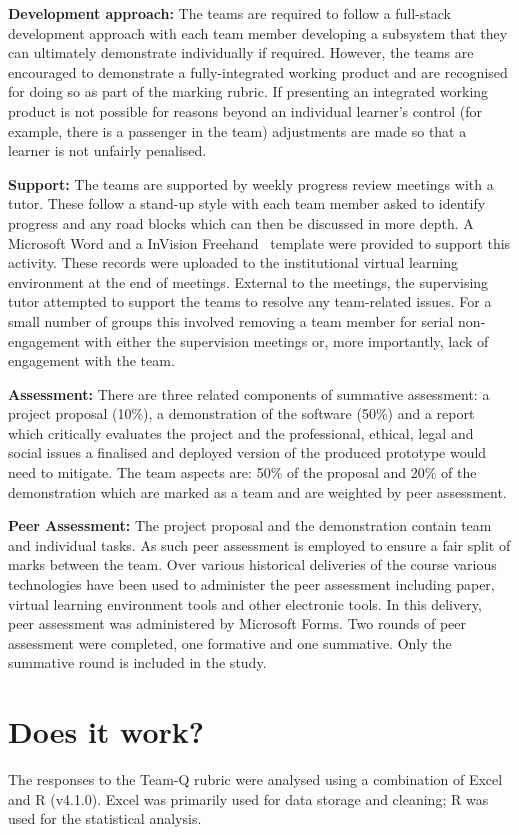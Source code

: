 \documentclass[sigconf, anonymous=true]{acmart}
\begin{document}
\textbf{Development approach:}
The teams are required to follow a full-stack development approach
with each team member developing a subsystem that they can ultimately
demonstrate individually if required. However, the teams are
encouraged to demonstrate a fully-integrated working product and are
recognised for doing so as part of the marking rubric. If presenting
an integrated working product is not possible for reasons beyond an
individual learner's control (for example, there is a passenger in the
team) adjustments are made so that a learner is not unfairly
penalised.

\textbf{Support:}
The teams are supported by weekly progress review meetings with a
tutor. These follow a stand-up style with each team member asked to
identify progress and any road blocks which can then be discussed in
more depth. A Microsoft Word and a InVision Freehand~\cite{InVision}
template were provided to support this activity. These records were
uploaded to the institutional virtual learning environment at the end of
meetings. External to the meetings, the supervising tutor attempted to
support the teams to resolve any team-related issues. For a small
number of groups this involved removing a team member for serial
non-engagement with either the supervision meetings or, more
importantly, lack of engagement with the team.

\textbf{Assessment:}
There are three related components of summative assessment: a project
proposal (10\%), a demonstration of the software (50\%) and a report
which critically evaluates the project and the professional, ethical,
legal and social issues a finalised and deployed version of the
produced prototype would need to mitigate. The team aspects are: 50\%
of the proposal and 20\% of the demonstration which are marked as a
team and are weighted by peer assessment.

\textbf{Peer Assessment:}
The project proposal and the demonstration contain team and individual
tasks. As such peer assessment is employed to ensure a fair split of
marks between the team. Over various historical deliveries of the
course various technologies have been used to administer the peer
assessment including paper, virtual learning environment tools and
other electronic tools. In this delivery, peer assessment was
administered by Microsoft Forms. Two rounds of peer assessment were
completed, one formative and one summative. Only the summative round
is included in the study.

\section{Does it work?}	
The responses to the Team-Q rubric were analysed using a combination
of Excel and R (v4.1.0). Excel was primarily used for data storage
and cleaning; R was used for the statistical analysis.
\end{document}
